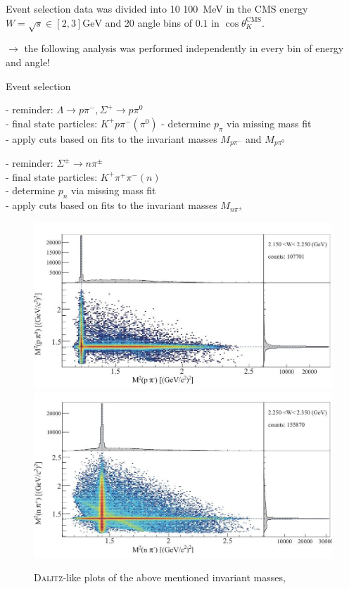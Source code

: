 \documentclass[11pt,aspectratio=1610,dvipsnames]{beamer}
\begin{document}
\begin{frame}{Event selection}
	data was divided into 10  \SI{100}{\mega\eV} in the CMS energy $W=\sqrt{s}\in[2,3]\si{\giga\eV}$ and 20 angle bins of $0.1$ in $\cos\theta^\text{CMS}_K$.

$\to$ the following analysis was performed independently in every bin of energy and angle!
\end{frame}
\begin{frame}{Event selection}
	\centering
	\begin{minipage}{.49\linewidth}
		\begin{tcolorbox}[colback=black!10,colframe=gray!20!black,title=extracting $\Lambda\pi^0$ and $\Sigma^+\pi^-$] 
		- reminder: $\Lambda\to p\pi^-, \Sigma^+\to p\pi^0$\\	
		- final state particles: $K^+p\pi^-(\pi^0)$ 
		- determine $p_\pi$ via missing mass fit\\
		- apply cuts based on fits to the invariant masses $M_{p\pi^-}$ and $M_{p\pi^0}$	
			
			
	\end{tcolorbox}	
\end{minipage}
\begin{minipage}{.49\linewidth}
	\begin{tcolorbox}[colback=black!10,colframe=gray!20!black,title=extracting $\Sigma^+\pi^-$ and $\Sigma^-\pi^+$] 
	- reminder: $\Sigma^\pm\to n\pi^\pm$\\
	- final state particles: $K^+\pi^+\pi^-(n)$\\
	- determine $p_n$ via missing mass fit\\
	- apply cuts based on fits to the invariant masses $M_{n\pi^\pm}$
	\end{tcolorbox}	
\end{minipage}
\begin{figure}[H]
	\centering
	\includegraphics[width=.49\linewidth]{inv_mass_1}
	\includegraphics[width=.49\linewidth]{inv_mass_2}
	\caption*{\textsc{Dalitz}-like plots of the above mentioned invariant masses,  \citet{lineshapes}}
\end{figure}
\end{frame}
\end{document}
